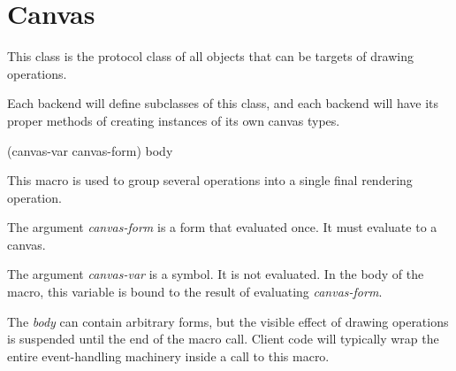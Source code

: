\chapter{Canvas}
\label{chap-canvas}


This class is the protocol class of all objects that can be targets of
drawing operations.

Each backend will define subclasses of this class, and each backend
will have its proper methods of creating instances of its own canvas
types.

 {(canvas-var canvas-form) \body body}

This macro is used to group several operations into a single final
rendering operation.

The argument \textit{canvas-form} is a form that evaluated once.  It
must evaluate to a canvas.

The argument \textit{canvas-var} is a symbol.  It is not evaluated.
In the body of the macro, this variable is bound to the result of
evaluating \textit{canvas-form}.

The \textit{body} can contain arbitrary forms, but the visible effect
of drawing operations is suspended until the end of the macro call.
Client code will typically wrap the entire event-handling machinery
inside a call to this macro.
